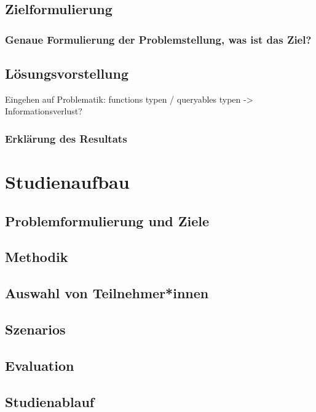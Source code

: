 \documentclass[oneside,a4paper,11pt,openright]{scrreprt}
\begin{document}
\subsection{Zielformulierung}
\subsubsection{Genaue Formulierung der Problemstellung, was ist das Ziel?}
\subsection{Lösungsvorstellung}
Eingehen auf Problematik: functions typen / queryables typen -> Informationsverlust?
\subsubsection{Erklärung des Resultats}

\clearpage
\section{Studienaufbau}
\subsection{Problemformulierung und Ziele}
\subsection{Methodik}
\subsection{Auswahl von Teilnehmer*innen}
\subsection{Szenarios}
\subsection{Evaluation}
\subsection{Studienablauf}

\clearpage

\end{document}
